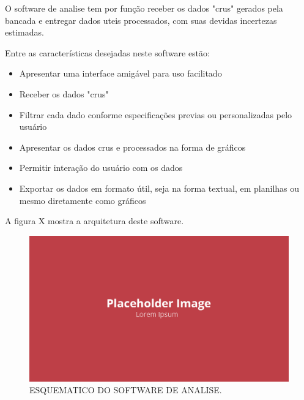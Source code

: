 O software de analise tem por função receber os dados "crus" gerados pela bancada e entregar dados uteis processados, com suas devidas incertezas estimadas.

Entre as características desejadas neste software estão:

\begin{itemize}
    \item Apresentar uma interface amigável para uso facilitado
    \item Receber os dados "crus"
    \item Filtrar cada dado conforme especificações previas ou personalizadas pelo usuário
    \item Apresentar os dados crus e processados na forma de gráficos
    \item Permitir interação do usuário com os dados
    \item Exportar os dados em formato útil, seja na forma textual, em planilhas ou mesmo diretamente como gráficos
\end{itemize}

A figura X mostra a arquitetura deste software.

\begin{figure}[!ht]
    \centering
    \includegraphics[width=.8\linewidth]{figuras/placeholder.png}
    \caption{ESQUEMATICO DO SOFTWARE DE ANALISE\cite{autor}.}
    \label{fig:placeholder}
\end{figure}
